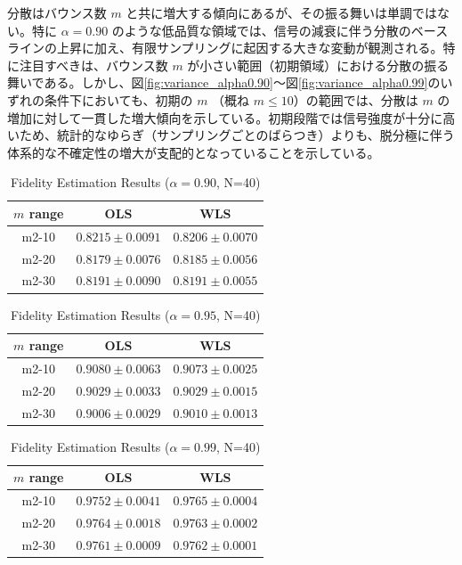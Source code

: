 \documentclass[12pt,a4paper,titlepage,dvipdfmx]{article}
\begin{document}
分散はバウンス数 $m$ と共に増大する傾向にあるが、その振る舞いは単調ではない。特に $\alpha=0.90$ のような低品質な領域では、信号の減衰に伴う分散のベースラインの上昇に加え、有限サンプリングに起因する大きな変動が観測される。特に注目すべきは、バウンス数 $m$ が小さい範囲（初期領域）における分散の振る舞いである。しかし、図\ref{fig:variance_alpha0.90}～図\ref{fig:variance_alpha0.99}のいずれの条件下においても、初期の $m$ （概ね $m \leq 10$）の範囲では、分散は $m$ の増加に対して一貫した増大傾向を示している。初期段階では信号強度が十分に高いため、統計的なゆらぎ（サンプリングごとのばらつき）よりも、脱分極に伴う体系的な不確定性の増大が支配的となっていることを示している。

\begin{table}[htbp]
    \centering
    \caption{Fidelity Estimation Results ($\alpha=0.90$, N=40)}
    \label{tab:fidelity_alpha0.90}
    \begin{tabular}{c|cc}
    \hline
    $m$ range & OLS & WLS \\
    \hline
    m2-10 & $0.8215 \pm 0.0091$ & $0.8206 \pm 0.0070$ \\
    m2-20 & $0.8179 \pm 0.0076$ & $0.8185 \pm 0.0056$ \\
    m2-30 & $0.8191 \pm 0.0090$ & $0.8191 \pm 0.0055$ \\
    \hline
    \end{tabular}
\end{table}

\begin{table}[htbp]
    \centering
    \caption{Fidelity Estimation Results ($\alpha=0.95$, N=40)}
    \label{tab:fidelity_alpha0.95}
    \begin{tabular}{c|cc}
    \hline
    $m$ range & OLS & WLS \\
    \hline
    m2-10 & $0.9080 \pm 0.0063$ & $0.9073 \pm 0.0025$ \\
    m2-20 & $0.9029 \pm 0.0033$ & $0.9029 \pm 0.0015$ \\
    m2-30 & $0.9006 \pm 0.0029$ & $0.9010 \pm 0.0013$ \\
    \hline
    \end{tabular}
\end{table}

\begin{table}[htbp]
    \centering
    \caption{Fidelity Estimation Results ($\alpha=0.99$, N=40)}
    \label{tab:fidelity_alpha0.99}
    \begin{tabular}{c|cc}
    \hline
    $m$ range & OLS & WLS \\
    \hline
    m2-10 & $0.9752 \pm 0.0041$ & $0.9765 \pm 0.0004$ \\
    m2-20 & $0.9764 \pm 0.0018$ & $0.9763 \pm 0.0002$ \\
    m2-30 & $0.9761 \pm 0.0009$ & $0.9762 \pm 0.0001$ \\
    \hline
    \end{tabular}
\end{table}
\end{document}
